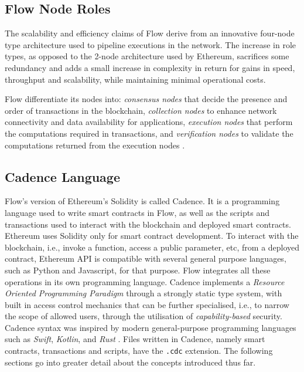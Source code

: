 \documentclass[../access.tex]{subfiles}
\begin{document}
\subsection{Flow Node Roles}
The scalability and efficiency claims of Flow derive from an innovative four-node type architecture used to pipeline executions in the network. The increase in role types, as opposed to the 2-node architecture used by Ethereum, sacrifices some redundancy and adds a small increase in complexity in return for gains in speed, throughput and scalability, while maintaining minimal operational costs.
\par
Flow differentiate its nodes into: \textit{consensus nodes} that decide the presence and order of transactions in the blockchain, \textit{collection nodes} to enhance network connectivity and data availability for applications, \textit{execution nodes} that perform the computations required in transactions, and \textit{verification nodes} to validate the computations returned from the execution nodes \cite{Hentschel2019b}.

\subsection{Cadence Language}
\label{sec:cadence_language}
Flow's version of Ethereum's Solidity is called Cadence. It is a programming language used to write smart contracts in Flow, as well as the scripts and transactions used to interact with the blockchain and deployed smart contracts. Ethereum uses Solidity only for smart contract development. To interact with the blockchain, i.e., invoke a function, access a public parameter, etc, from a deployed contract, Ethereum API is compatible with several general purpose languages, such as Python and Javascript, for that purpose. Flow integrates all these operations in its own programming language. Cadence implements a \textit{Resource Oriented Programming Paradigm} through a strongly static type system, with built in access control mechanics that can be further specialised, i.e., to narrow the scope of allowed users, through the utilisation of \textit{capability-based} security. Cadence syntax was inspired by modern general-purpose programming languages such as \textit{Swift}, \textit{Kotlin}, and \textit{Rust} \cite{flow2020a} \cite{Cadence2023}. Files written in Cadence, namely smart contracts, transactions and scripts, have the \verb|.cdc| extension. The following sections go into greater detail about the concepts introduced thus far.
\end{document}
